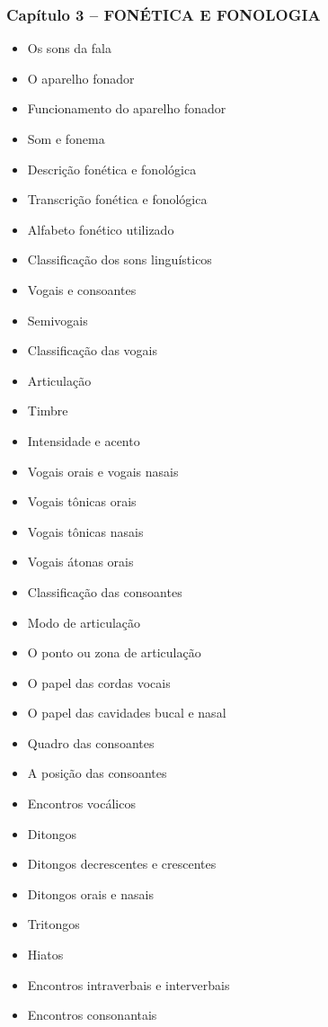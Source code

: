 \documentclass[a4paper,12pt]{article}[abntex2]
\begin{document}
\subsubsection*{Capítulo 3 – FONÉTICA E FONOLOGIA}
\begin{itemize}
    \item Os sons da fala
    \item O aparelho fonador
    \item Funcionamento do aparelho fonador
    \item Som e fonema
    \item Descrição fonética e fonológica
    \item Transcrição fonética e fonológica
    \item Alfabeto fonético utilizado
    \item Classificação dos sons linguísticos
    \item Vogais e consoantes
    \item Semivogais
    \item Classificação das vogais
    \item Articulação
    \item Timbre
    \item Intensidade e acento
    \item Vogais orais e vogais nasais
    \item Vogais tônicas orais
    \item Vogais tônicas nasais
    \item Vogais átonas orais
    \item Classificação das consoantes
    \item Modo de articulação
    \item O ponto ou zona de articulação
    \item O papel das cordas vocais
    \item O papel das cavidades bucal e nasal
    \item Quadro das consoantes
    \item A posição das consoantes
    \item Encontros vocálicos
    \item Ditongos
    \item Ditongos decrescentes e crescentes
    \item Ditongos orais e nasais
    \item Tritongos
    \item Hiatos
    \item Encontros intraverbais e interverbais
    \item Encontros consonantais

\end{itemize}
\end{document}
